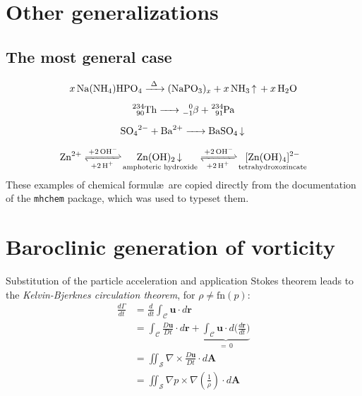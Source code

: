 

\section{Other generalizations}

\subsection{The most general case}

\begin{gather}
\ce{x Na(NH4)HPO4 ->[\Delta] (NaPO3)_x + x NH3 ^ + x H2O} \\[0.5em]
\ce{^234_90Th -> ^0_-1$\beta${} + ^234_91Pa} \\[0.5em]
\ce{SO4^2- + Ba^2+ -> BaSO4 v} \\[0.5em]
\ce{Zn^2+
<=>[+ 2OH-][+ 2H+]
$\underset{\textrm{amphoteric hydroxide}}{\ce{Zn(OH)2 v}}$
<=>[+ 2OH-][+ 2H+]
$\underset{\textrm{tetrahydroxozincate}}{\ce{[Zn(OH)4]^2-}}$
}
\end{gather}
These examples of chemical formul\ae\ are copied directly from the documentation of the \texttt{mhchem} package, which was used to typeset them.

\section{Baroclinic generation of vorticity\label{sec:stratified-flow}}

Substitution of the particle acceleration and application Stokes theorem leads to the \textit{Kelvin-Bjerknes circulation theorem}, for
$\rho \neq \textrm{fn}(p)$:
\begin{align}
\frac{d\Gamma}{dt} &{}= \frac{d}{dt} \int_{\mathcal{C}} \mathbf{u} \cdot d\mathbf{r}\\
				   &{}= \int_{\mathcal{C}} \frac{D\mathbf{u}}{Dt} \cdot d\mathbf{r} + \underbrace{\int_{\mathcal{C}} \mathbf{u}\cdot d\biggl( \frac{d\mathbf{r}}{dt}\biggr)}_{=\, 0} \\[-2pt]
                   &{}= \iint_{\mathcal{S}} \nabla \times \frac{D\mathbf{u}}{Dt}  \cdot d\mathbf{A}\\
                   &{}= \iint_{\mathcal{S}}  \nabla p \times \nabla \left( \frac{1}{\rho}\right) \cdot d\mathbf{A}
\end{align}

